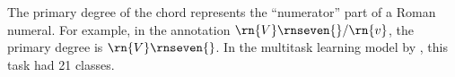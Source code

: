 
The primary degree of the chord represents the ``numerator''
part of a Roman numeral. For example, in the annotation
$\rn{V}\rnseven{}/\rn{v}$, the primary degree is
$\rn{V}\rnseven{}$. In the multitask learning model by
\textcite{chen2018functional}, this task had 21 classes.
